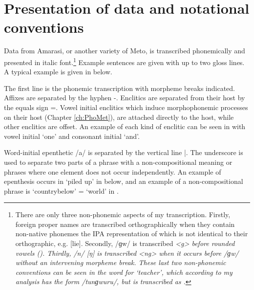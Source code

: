 \section{Presentation of data and notational conventions}\label{sec:PreDat}
Data from Amarasi, or another variety of Meto,
is transcribed phonemically and presented in italic font.\footnote{
		There are only three non-phonemic aspects of my transcription.
		Firstly, foreign proper names are transcribed orthographically
		when they contain non-native phonemes the IPA representation
		of which is not identical to their orthographic, e.g.  [li{\ny\tS}e].
		Secondly, /ɡw/ is transcribed \it{<g>} before rounded vowels ().
		Thirdly, /n/ {\ra} [ŋ] is transcribed \it{<ng>} when it occurs before /ɡw/
		without an intervening morpheme break.
		These last two non-phonemic conventions
		can be seen in the word for `teacher',
		which according to my analysis has the form /tunɡwuru/,
		but is transcribed as .}
Example sentences are given with up to two gloss lines.
A typical example is given in  below.

\begin{exe}
	\label{ex:120715-4, 0.55 ch:Intr}
\end{exe}

The first line is the phonemic transcription with morpheme breaks indicated.
Affixes are separated by the hyphen -.
Enclitics are separated from their host by the equals sign =.
Vowel initial enclitics which induce morphophonemic processes on their
host (Chapter \ref{ch:PhoMet}), are attached directly to the host,
while other enclitics are offset.
An example of each kind of enclitic can be seen in 
with vowel initial  `one' and consonant initial  `and'.

Word-initial epenthetic /a/ is separated by the vertical line |.
The underscore {\gap} is used to separate two parts of a phrase with
a non-compositional meaning or phrases where
one element does not occur independently.
An example of epenthesis occurs in 
`piled up' in  below,
and an example of a non-compositional phrase is
 `country{\gap}below' = `world'
in .

